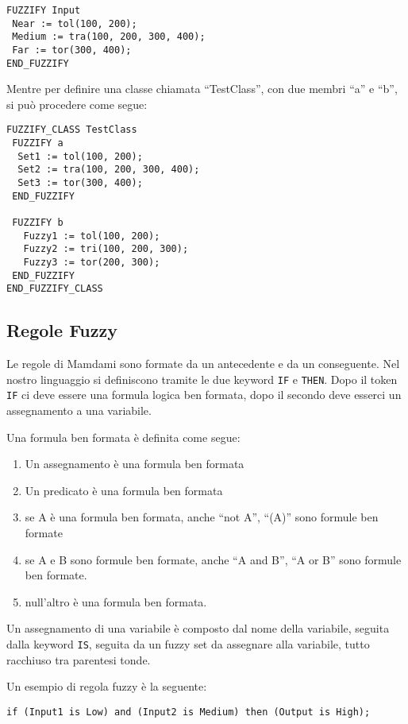 \begin{verbatim}
FUZZIFY Input
 Near := tol(100, 200);
 Medium := tra(100, 200, 300, 400);
 Far := tor(300, 400);
END_FUZZIFY
\end{verbatim}

Mentre per definire una classe chiamata ``TestClass'', con due membri ``a'' e ``b'', si può procedere come segue:

\begin{verbatim}
FUZZIFY_CLASS TestClass
 FUZZIFY a
  Set1 := tol(100, 200);
  Set2 := tra(100, 200, 300, 400);
  Set3 := tor(300, 400);
 END_FUZZIFY
 
 FUZZIFY b
   Fuzzy1 := tol(100, 200);
   Fuzzy2 := tri(100, 200, 300);
   Fuzzy3 := tor(200, 300);
 END_FUZZIFY
END_FUZZIFY_CLASS
\end{verbatim}


\subsection{Regole Fuzzy}
Le regole di Mamdami sono formate da un antecedente e da un conseguente. Nel nostro linguaggio si definiscono tramite le due keyword \verb|IF| e \verb|THEN|.
Dopo il token \verb|IF| ci deve essere una formula logica ben formata, dopo il secondo deve esserci un assegnamento a una variabile.

Una formula ben formata è definita come segue:
\begin{enumerate}
 \item Un assegnamento è una formula ben formata
 \item Un predicato è una formula ben formata
 \item se A è una formula ben formata, anche ``not A'', ``(A)'' sono formule ben formate
 \item se A e B sono formule ben formate, anche ``A and B'', ``A or B'' sono formule ben formate.
 \item null'altro è una formula ben formata.
\end{enumerate}

Un assegnamento di una variabile è composto dal nome della variabile, seguita dalla keyword \verb|IS|, seguita da un fuzzy set da assegnare alla variabile, tutto racchiuso tra parentesi tonde.

Un esempio di regola fuzzy è la seguente:

\begin{verbatim}
if (Input1 is Low) and (Input2 is Medium) then (Output is High); 
\end{verbatim}



